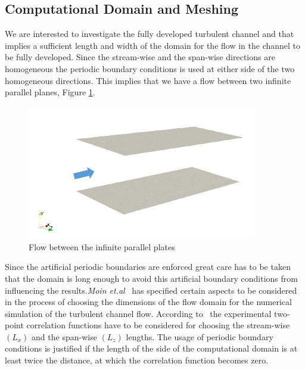 \subsection{Computational Domain and Meshing}
We are interested to investigate the fully developed turbulent channel and that implies a sufficient length and width of the domain for the flow in the channel to be fully developed. Since the stream-wise and the span-wise directions are homogeneous the periodic boundary conditions is used at either side of the two homogeneous directions. This implies that we have a flow between two infinite parallel planes, Figure \ref{infinite plates}.
%
\begin{figure}[h]
    \centering
    \includegraphics[width=0.9\textwidth]{figur/Infinite_plates.png}
    \caption{Flow between the infinite parallel plates}
    \label{infinite plates}
\end{figure}
%
Since the artificial periodic boundaries are enforced great care has to be taken that the domain is long enough to avoid this artificial boundary conditions from influencing the results.\emph{Moin et.al}~\cite{Moin:78} has specified certain aspects to be considered in the process of choosing the dimensions of the flow domain for the numerical simulation of the turbulent channel flow. According to~\cite{Moin:78} the experimental two-point correlation functions have to be considered for choosing the stream-wise $\left(L_x\right)$ and the span-wise $\left(L_z\right)$ lengths. The usage of periodic boundary conditions is justified if the length of the side of the computational domain is at least twice the distance, at which the correlation function becomes zero.\\


